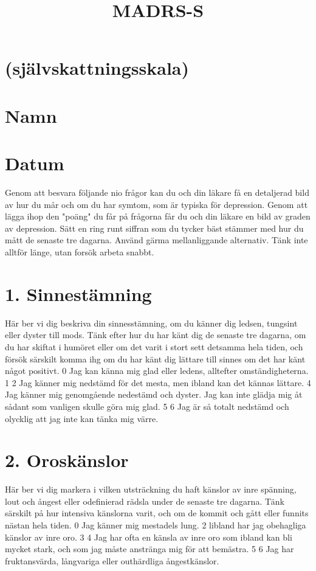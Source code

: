 \title{
MADRS-S
}
\section*{(självskattningsskala)}
\section*{Namn}
\section*{Datum}
Genom att besvara följande nio frågor kan du och din läkare få en detaljerad bild av hur du mår och om du har symtom, som är typiska för depression. Genom att lägga ihop den "poäng" du får på frågorna får du och din läkare en bild av graden av depression. Sätt en ring runt siffran som du tycker bäst stämmer med hur du mått de senaste tre dagarna. Använd gärma mellanliggande alternativ. Tänk inte alltför länge, utan forsök arbeta snabbt.
\section*{1. Sinnestämning}
Här ber vi dig beskriva din sinnesstämning, om du känner dig ledsen, tungsint eller dyster till mods. Tänk efter hur du har känt dig de senaste tre dagarna, om du har skiftat i humöret eller om det varit i stort sett detsamma hela tiden, och försök särskilt komma ihg om du har känt dig lättare till sinnes om det har känt något positivt.
0 Jag kan känna mig glad eller ledens, alltefter omständigheterna.
1
2 Jag känner mig nedstämd för det mesta, men ibland kan det kännas lättare.
4 Jag känner mig genomgående nedestämd och dyster. Jag kan inte glädja mig åt sådant som vanligen skulle göra mig glad.
5
6 Jag är så totalt nedstämd och olycklig att jag inte kan tänka mig värre.
\section*{2. Oroskänslor}
Här ber vi dig markera i vilken utsträckning du haft känslor av inre spänning, lout och ångest eller odefinierad rädsla under de senaste tre dagarna. Tänk särskilt på hur intensiva känslorna varit, och om de kommit och gått eller funnits nästan hela tiden.
0 Jag känner mig mestadels lung.
2 libland har jag obehagliga känslor av inre oro.
3
4 Jag har ofta en känsla av inre oro som ibland kan bli mycket stark, och som jag måste anstränga mig för att bemästra.
5
6 Jag har fruktansvärda, långvariga eller outhärdliga ångestkänslor.
